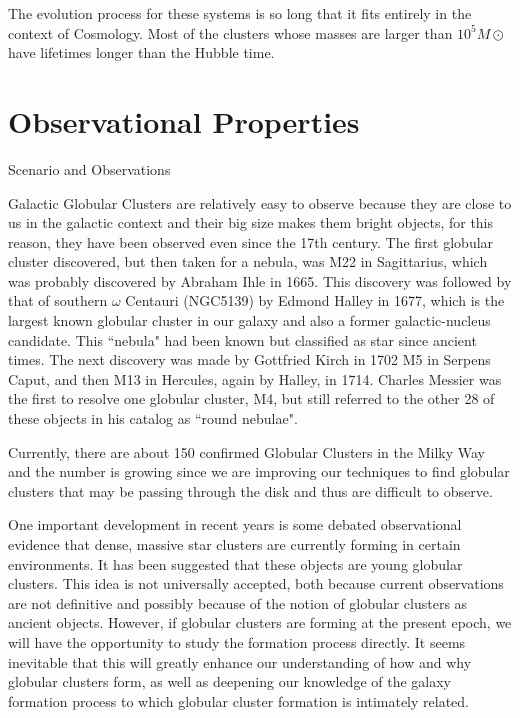 The evolution process for these systems is so long that it fits entirely in the context of Cosmology. Most of the clusters whose masses are larger than $10^{5}M\odot$ have lifetimes longer than the Hubble time.

\section{Observational Properties}


Scenario and Observations

Galactic Globular Clusters are relatively easy to observe because they are close to us in the galactic context and their big size makes them bright objects, for this reason, they have been observed even since the 17th century. The first globular cluster discovered, but then taken for a nebula, was M22 in Sagittarius, which was probably discovered by Abraham Ihle in 1665. This discovery was followed by that of southern $\omega$ Centauri (NGC5139) by Edmond Halley in 1677, which is the largest known globular cluster in our galaxy and also a former galactic-nucleus candidate. This ``nebula" had been known but classified as star since ancient times. The next discovery was made by Gottfried Kirch in 1702 M5 in Serpens Caput, and then M13 in Hercules, again by Halley, in 1714. Charles Messier was the first to resolve one globular cluster, M4, but still referred to the other 28 of these objects in his catalog as ``round nebulae". 

Currently, there are about 150 confirmed Globular Clusters in the Milky Way and the number is growing since we are improving our techniques to find globular clusters that may be passing through the disk and thus are difficult to observe.

One important development in recent years is some debated observational evidence that dense, massive star clusters are currently forming in certain environments. It has been suggested that these objects are young globular clusters. This idea is not universally accepted, both because current observations are not definitive and possibly because of the notion of globular clusters as ancient objects. However, if globular clusters are forming at the present epoch, we will have the opportunity to study the formation process directly. It seems inevitable that this will greatly enhance our understanding of how and why globular clusters form, as well as deepening our knowledge of the galaxy formation process to which globular cluster formation is intimately related.

